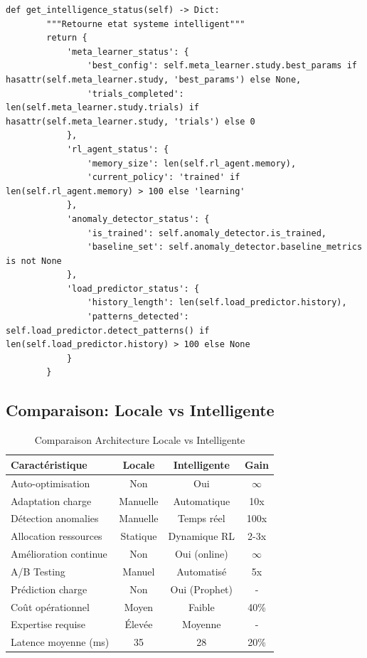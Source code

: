 \documentclass[12pt,a4paper]{article}
\begin{document}
\begin{lstlisting}[caption={Intelligent Orchestrator - Point Central}]
    def get_intelligence_status(self) -> Dict:
        """Retourne etat systeme intelligent"""
        return {
            'meta_learner_status': {
                'best_config': self.meta_learner.study.best_params if hasattr(self.meta_learner.study, 'best_params') else None,
                'trials_completed': len(self.meta_learner.study.trials) if hasattr(self.meta_learner.study, 'trials') else 0
            },
            'rl_agent_status': {
                'memory_size': len(self.rl_agent.memory),
                'current_policy': 'trained' if len(self.rl_agent.memory) > 100 else 'learning'
            },
            'anomaly_detector_status': {
                'is_trained': self.anomaly_detector.is_trained,
                'baseline_set': self.anomaly_detector.baseline_metrics is not None
            },
            'load_predictor_status': {
                'history_length': len(self.load_predictor.history),
                'patterns_detected': self.load_predictor.detect_patterns() if len(self.load_predictor.history) > 100 else None
            }
        }
\end{lstlisting}

\subsection{Comparaison: Locale vs Intelligente}

\begin{table}[H]
\centering
\small
\begin{tabular}{|l|c|c|c|}
\hline
\textbf{Caractéristique} & \textbf{Locale} & \textbf{Intelligente} & \textbf{Gain} \\
\hline
Auto-optimisation & Non & Oui & $\infty$ \\
\hline
Adaptation charge & Manuelle & Automatique & 10x \\
\hline
Détection anomalies & Manuelle & Temps réel & 100x \\
\hline
Allocation ressources & Statique & Dynamique RL & 2-3x \\
\hline
Amélioration continue & Non & Oui (online) & $\infty$ \\
\hline
A/B Testing & Manuel & Automatisé & 5x \\
\hline
Prédiction charge & Non & Oui (Prophet) & - \\
\hline
Coût opérationnel & Moyen & Faible & 40\% \\
\hline
Expertise requise & Élevée & Moyenne & - \\
\hline
Latence moyenne (ms) & 35 & 28 & 20\% \\
\hline
\end{tabular}
\caption{Comparaison Architecture Locale vs Intelligente}
\end{table}
\end{document}
